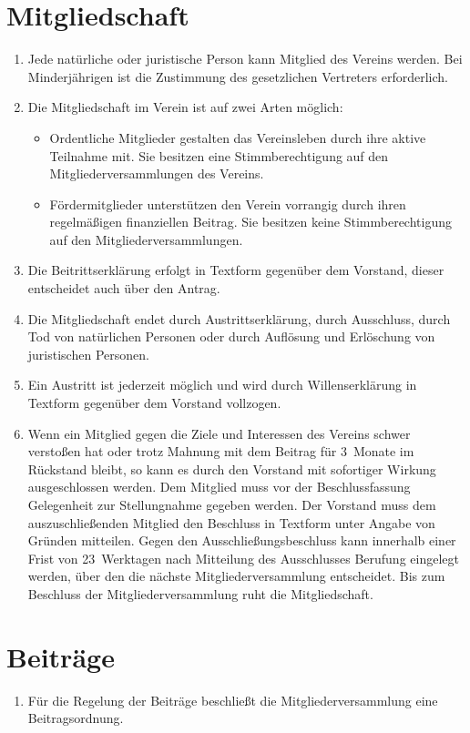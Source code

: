 \documentclass[a4paper,12pt]{scrartcl}
\begin{document}
\section{Mitgliedschaft}
\begin{enumerate}
  \item Jede natürliche oder juristische Person kann Mitglied des Vereins
    werden. Bei Minderjährigen ist die Zustimmung des gesetzlichen Vertreters
    erforderlich.
  \item Die Mitgliedschaft im Verein ist auf zwei Arten möglich:
    \begin{itemize}
      \item Ordentliche Mitglieder gestalten das Vereinsleben durch ihre aktive
        Teilnahme mit. Sie besitzen eine Stimmberechtigung auf den
        Mitgliederversammlungen des Vereins.
      \item Fördermitglieder unterstützen den Verein vorrangig durch ihren
        regelmäßigen finanziellen Beitrag. Sie besitzen keine Stimmberechtigung
        auf den Mitgliederversammlungen.
    \end{itemize}
  \item Die Beitrittserklärung erfolgt in Textform gegenüber dem Vorstand,
    dieser entscheidet auch über den Antrag.
  \item Die Mitgliedschaft endet durch Austrittserklärung, durch Ausschluss,
    durch Tod von natürlichen Personen oder durch Auflösung und Erlöschung von
    juristischen Personen.
  \item Ein Austritt ist jederzeit möglich und wird durch Willenserklärung in
    Textform gegenüber dem Vorstand vollzogen.
  \item Wenn ein Mitglied gegen die Ziele und Interessen des Vereins schwer
    verstoßen hat oder trotz Mahnung mit dem Beitrag für 3~Monate im Rückstand
    bleibt, so kann es durch den Vorstand mit sofortiger Wirkung ausgeschlossen
    werden. Dem Mitglied muss vor der Beschlussfassung Gelegenheit zur
    Stellungnahme gegeben werden. Der Vorstand muss dem auszuschließenden
    Mitglied den Beschluss in Textform unter Angabe von Gründen mitteilen. Gegen
    den Ausschließungsbeschluss kann innerhalb einer Frist von 23~Werktagen nach
    Mitteilung des Ausschlusses Berufung eingelegt werden, über den die nächste
    Mitgliederversammlung entscheidet. Bis zum Beschluss der
    Mitgliederversammlung ruht die Mitgliedschaft.
\end{enumerate}

\section{Beiträge}
\begin{enumerate}
  \item Für die Regelung der Beiträge beschließt die Mitgliederversammlung eine
    Beitragsordnung.
\end{enumerate}
\end{document}
